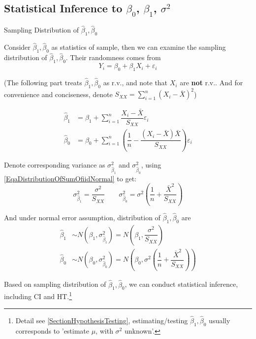 \subsection{Statistical Inference to $ \beta _0 $, $ \beta _1 $, $ \sigma ^2 $}

\begin{point}
    Sampling Distribution of $ \hat{\beta} _1,\hat{\beta} _0  $
\end{point}

    Consider $ \hat{\beta} _1,\hat{\beta} _0 $ as statistics of sample, then we can examine the sampling distribution of $  \hat{\beta} _1,\hat{\beta} _0 $. Their randomness comes from
    \begin{equation}
        Y_i=\beta_0+\beta_1X_i+\varepsilon _i 
    \end{equation}
    
    

    (The following part treats $\hat{\beta} _1,\hat{\beta} _0 $ as r.v., and note that $ X_i $ are \textbf{not }r.v.. And  for convenience and conciseness, denote $ S_{XX}={\displaystyle\sum_{i=1}^n(X_i-\bar{X})^2} $)

   
\begin{align}
        \hat{\beta }_1&=\beta _1+\sum_{i=1}^n\dfrac{X_i-\bar{X}}{S_{XX}}\varepsilon _i\\
        \hat{\beta }_0&=\beta _0+\sum_{i=1}^n\left(\dfrac{1}{n}-\dfrac{(X_i-\bar{X})\bar{X}}{S_{XX}}\right)\varepsilon _i
\end{align}
 
    Denote corresponding variance as $ \sigma^2_{\hat{\beta}_1} $ and $ \sigma^2_{\hat{\beta}_0} $, using \autoref{EqaDistributionOfSumOfiidNormal} to get:
    \begin{equation}
        \sigma^2_{\hat{\beta}_1}= \dfrac{\sigma^2}{S_{XX}}\qquad \sigma^2_{\hat{\beta}_0}=\sigma^2(\dfrac{1}{n}+\dfrac{\bar{X}^2}{S_{XX}})
    \end{equation} 
    
     And under normal error assumption, distribution of $ \hat{\beta} _1,\hat{\beta} _0  $ are
    \begin{align}
        \hat{\beta }_1&\sim N(\beta _1,\sigma^2_{\hat{\beta}_1}) =N(\beta_1,\dfrac{\sigma^2}{S_{XX}})\\
        \hat{\beta}_0&\sim N(\beta_0,\sigma^2_{\hat{\beta }_0}) =N(\beta_0,\sigma^2(\dfrac{1}{n}+\dfrac{\bar{X}^2}{S_{XX}}))
    \end{align}
    
    Based on sampling distribution of $ \hat{\beta} _1,\hat{\beta} _0  $, we can conduct statistical inference, including CI and HT.\footnote{Detail see \autoref{SectionHypothesisTesting}, estimating/testing $ \hat{\beta} _1,\hat{\beta} _0  $ usually corresponds to 'estimate $ \mu $, with $ \sigma^2 $ unknown'.}
    
